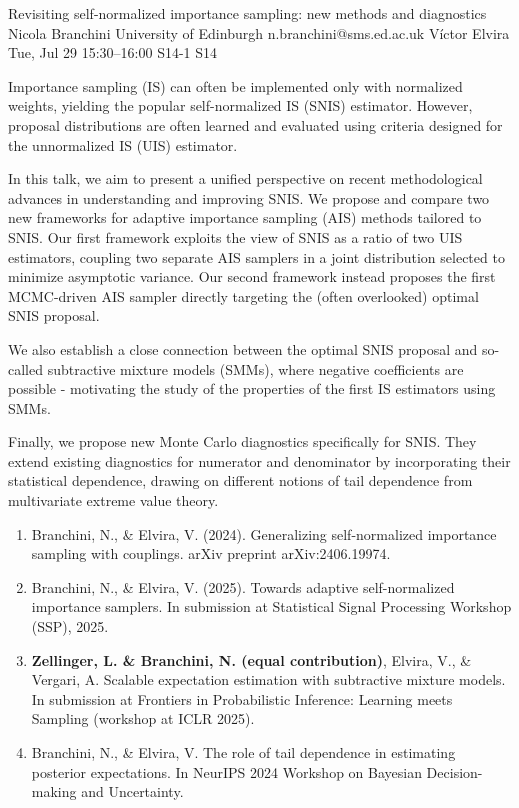 \documentclass[12pt,lettersize,oneside]{book} %
\begin{document}
\begin{talk}
  {Revisiting self-normalized importance sampling: new methods and diagnostics}%
  {Nicola Branchini}%
  {University of Edinburgh}%
  {n.branchini@sms.ed.ac.uk}%
  {V\'ictor Elvira}%
  {}%
  {Tue, Jul 29 15:30--16:00}%
  {S14-1}%
  {S14}%
  
    
   
Importance sampling (IS) can often be implemented only with normalized weights, yielding the popular self-normalized IS (SNIS) estimator. However, proposal distributions are often learned and evaluated using criteria designed for the unnormalized IS (UIS) estimator.

In this talk, we aim to present a unified perspective on recent methodological advances in understanding and improving SNIS.
We propose and compare two new frameworks for adaptive importance sampling (AIS) methods tailored to SNIS. Our first framework exploits the view of SNIS as a ratio of two UIS estimators, coupling two separate AIS samplers in a joint distribution selected to minimize asymptotic variance. Our second framework instead proposes the first MCMC-driven AIS sampler directly targeting the (often overlooked) optimal SNIS proposal.

We also establish a close connection between the optimal SNIS proposal and so-called subtractive mixture models (SMMs), where negative coefficients are possible - motivating the study of the properties of the first IS estimators using SMMs.

Finally, we propose new Monte Carlo diagnostics specifically for SNIS. They extend existing diagnostics for numerator and denominator by incorporating their statistical dependence, drawing on different notions of tail dependence from multivariate extreme value theory.

\medskip

\begin{enumerate}
 \item[{[1]}] Branchini, N., \& Elvira, V. (2024). Generalizing self-normalized importance sampling with couplings. arXiv preprint arXiv:2406.19974.
 \item[{[2]}] Branchini, N., \& Elvira, V. (2025). Towards adaptive self-normalized importance samplers. In submission at Statistical Signal Processing Workshop (SSP), 2025.
    \item[{[3]}] \textbf{Zellinger, L. \& Branchini, N. (equal contribution)}, Elvira, V., \& Vergari, A. Scalable expectation estimation with subtractive mixture models. In submission at Frontiers in Probabilistic Inference: Learning meets Sampling (workshop at ICLR 2025).
    \item[{[4]}] Branchini, N., \& Elvira, V. The role of tail dependence in estimating posterior expectations. In NeurIPS 2024 Workshop on Bayesian Decision-making and Uncertainty.


\end{enumerate}

\end{talk}
\end{document}
